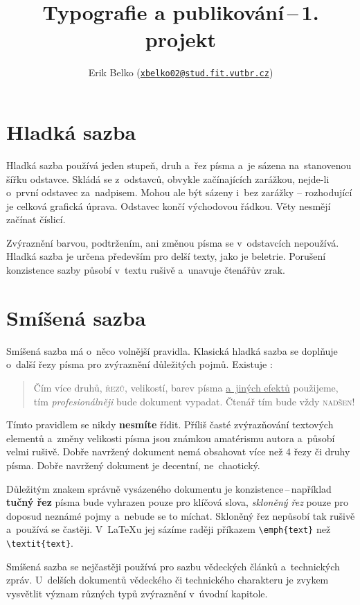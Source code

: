 \documentclass[a4paper, 10pt, twocolumn]{article}[22.2.2020]
\title{Typografie a publikování\,--\,1. projekt}
\author{Erik Belko (\href{mailto:xbelko02@stud.fit.vutbr.cz}{\texttt{xbelko02@stud.fit.vutbr.cz}})}
\date{}
\begin{document}
\maketitle

\section{Hladká sazba}
Hladká sazba používá jeden stupeň, druh a~řez písma 
a~je sázena na~stanovenou šířku odstavce. 
Skládá se z~odstavců, obvykle začínajících zarážkou, \mbox{nejde-li}
o~první odstavec za~nadpisem. 
Mohou ale být sázeny i~bez zarážky – rozhodující je celková grafická úprava.
Odstavec končí východovou řádkou. 
Věty nesmějí začínat číslicí.
\par Zvýraznění barvou, podtržením, ani změnou písma
se v~odstavcích nepoužívá. 
Hladká sazba je určena především pro delší texty, jako je beletrie. 
Porušení konzistence sazby působí v~textu rušivě a~unavuje čtenářův zrak.

\section{Smíšená sazba}
Smíšená sazba má o~něco volnější pravidla. 
Klasická hladká sazba se doplňuje o~další řezy písma pro zvýraznění důležitých pojmů. 
Existuje :
\medskip
\begin{quotation}
{\selectfont Čím více druhů, }\textsc{řezů, }{\tiny velikostí}, barev písma \underline{a~jiných efektů} použijeme, tím {\emph{\large profesionálněji}} bude dokument vypadat. Čtenář tím bude vždy \textsc{nadšen}!
\end{quotation}
\medskip
\par {\footnotesize Tímto} pravidlem se nikdy \textbf{nesmíte} řídit. Příliš časté {\large zvýrazňování }textových elementů a~změny velikosti {\huge písma }jsou známkou amatérismu autora a~působí {\Huge velmi} rušivě. Dobře navržený dokument nemá obsahovat více než 4 řezy či druhy písma. Dobře navržený dokument je decentní, ne~chaotický.
\par Důležitým znakem správně vysázeného dokumentu je konzistence\,--\,například \textbf{tučný řez} písma bude vyhrazen pouze pro klíčová slova, \emph{skloněný řez} pouze pro doposud neznámé pojmy a~nebude se to míchat. Skloněný řez nepůsobí tak rušivě a~používá se častěji. V~\LaTeX u jej sázíme raději příkazem \verb|\emph{text}| než \verb|\textit{text}|.
\par Smíšená sazba se nejčastěji používá pro sazbu vědeckých článků a~technických zpráv. U~delších dokumentů vědeckého či technického charakteru je zvykem vysvětlit význam různých typů zvýraznění v~úvodní kapitole.
\end{document}
